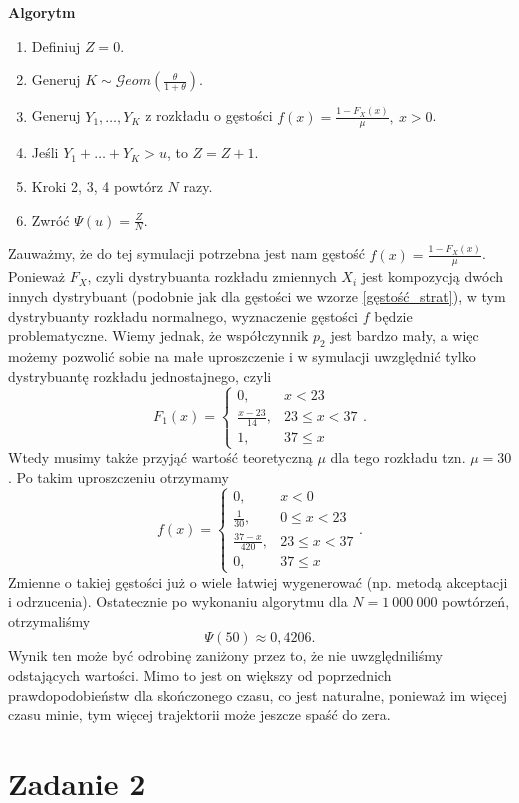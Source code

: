 \documentclass[12pt]{mwart}
\begin{document}
	\noindent \textbf{Algorytm}
	\begin{enumerate}[leftmargin=10mm]
		\item Definiuj $Z = 0$.
		\item Generuj $K \sim \mathcal{G}eom \left( \frac{\theta}{1+\theta} \right)$.
		\item Generuj $Y_1, \dots, Y_K$ z rozkładu o gęstości $f(x) = \frac{1 - F_X(x)}{\mu}, \ x > 0$.
		\item Jeśli $Y_1 + \dots + Y_K > u$, to $Z = Z + 1$.
		\item Kroki 2, 3, 4 powtórz $N$ razy.
		\item Zwróć $\Psi(u) = \frac{Z}{N}$.
	\end{enumerate}
	Zauważmy, że do tej symulacji potrzebna jest nam gęstość $f(x) = \frac{1 - F_X(x)}{\mu}$. Ponieważ $F_X$, czyli dystrybuanta rozkładu zmiennych $X_i$ jest kompozycją dwóch innych dystrybuant (podobnie jak dla gęstości we wzorze \eqref{gęstość_strat}), w tym dystrybuanty rozkładu normalnego, wyznaczenie gęstości $f$ będzie problematyczne. Wiemy jednak, że współczynnik $p_2$ jest bardzo mały, a więc możemy pozwolić sobie na małe uproszczenie i w symulacji uwzględnić tylko dystrybuantę rozkładu jednostajnego, czyli
	$$ F_1(x) = \begin{cases}
		0, & x < 23 \\
		\frac{x - 23}{14}, & 23 \leq x < 37 \\
		1, & 37 \leq x
	\end{cases}. $$
	Wtedy musimy także przyjąć wartość teoretyczną $\mu$ dla tego rozkładu tzn. $\mu = 30$. Po takim uproszczeniu otrzymamy 
	$$ f(x) = \begin{cases}
		0, & x < 0 \\
		\frac{1}{30}, & 0 \leq x < 23 \\
		\frac{37 - x}{420}, & 23 \leq x < 37\\
		0, & 37 \leq x
		\end{cases}. $$
	Zmienne o takiej gęstości już o wiele łatwiej wygenerować (np. metodą akceptacji i odrzucenia). Ostatecznie po wykonaniu algorytmu dla $N = 1\ 000\ 000$ powtórzeń, otrzymaliśmy
	$$ \Psi(50) \approx 0,4206.$$
	Wynik ten może być odrobinę zaniżony przez to, że nie uwzględniliśmy odstających wartości. Mimo to jest on większy od poprzednich prawdopodobieństw dla skończonego czasu, co jest naturalne, ponieważ im więcej czasu minie, tym więcej trajektorii może jeszcze spaść do zera.
	
	
	\section{Zadanie 2}
\end{document}
